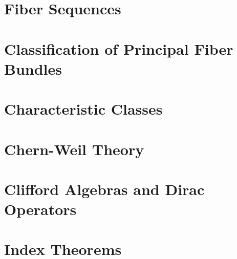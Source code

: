 \section{Fiber Sequences}


\section{Classification of Principal Fiber Bundles}

\section{Characteristic Classes}

\section{Chern-Weil Theory}
\section{Clifford Algebras and Dirac Operators}
\section{Index Theorems}
